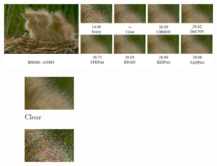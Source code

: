  \begin{figure}[t!]
    \centering
        \includegraphics[width=0.96\textwidth]{images/deneme.png}
        \begin{subfigure}{0.28\textwidth}
            \includegraphics[width=\linewidth]{images/bsd_gt.png}
            \caption{Clear}
            \label{fig:bsd_clear}
        \end{subfigure}\hfil %
        \begin{subfigure}{0.28\textwidth}
            \includegraphics[width=\linewidth]{images/bsd_noisy.png}

\end{subfigure}
\end{figure}

